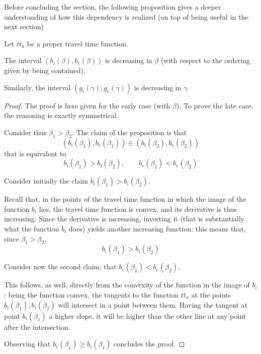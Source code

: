 Before concluding the section, the following proposition gives a deeper understanding of how this dependency is realized
(on top of being useful in the next section)
\begin{prop}
  \label{prop:monotonous_interv}
  Let \(tt_a\) be a proper travel time function.

  The interval \((b_i(\beta), b_e(\beta))\) is decreasing in \(\beta\) (with respect to the ordering given by being contained).

  Similarly, the interval \((g_i(\gamma), g_e(\gamma))\) is decreasing in \(\gamma\).
\end{prop}
\begin{proof}
  The proof is here given for the early case (with \(\beta\)).
  To prove the late case, the reasoning is exactly symmetrical.

  Consider thus \(\beta_1 > \beta_2\).
  The claim of the proposition is that
  \[(b_i(\beta_1), b_e(\beta_1)) \in (b_i(\beta_2), b_e(\beta_2))\]
  that is equivalent to
  \begin{equation*}
    b_i(\beta_1) > b_i(\beta_2),\qquad b_e(\beta_1) < b_e(\beta_2)
  \end{equation*}

  Consider initially the claim \(b_i(\beta_1) > b_i(\beta_2)\).

  Recall that,
  in the points of the travel time function in which the image of the function \(b_i\) lies,
  the travel time function is convex, and its derivative is thus increasing.
  Since the derivative is increasing, inverting it (that is substantially what the function \(b_i\) does) yields another increasing function:
  this means that, since \(\beta_1 > \beta_2\),
  \begin{equation*}
    b_i(\beta_1) > b_i(\beta_2)
  \end{equation*}

  Consider now the second claim, that \(b_e(\beta_1) < b_e(\beta_2)\).

  This follows, as well, directly from the convexity of the function in the image of \(b_i\):
  being the function convex,
  the tangents to the function \(tt_a\) at the points \(b_i(\beta_1), b_i(\beta_2)\) will intersect in a point between them.
  Having the tangent at point \(b_i(\beta_1)\) a higher slope,
  it will be higher than the other line at any point after the intersection.

  Observing that \(b_e(\beta_1) \geq b_i(\beta_1)\) concludes the proof.
\end{proof}

